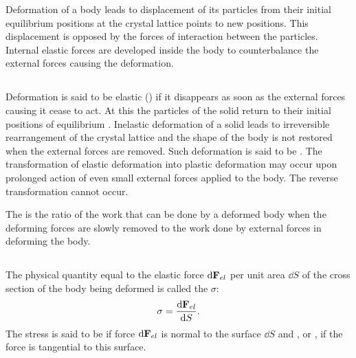 Deformation of a body leads to displacement of its particles from their initial equilibrium positions at the crystal lattice points  to new positions. This displacement is opposed by the forces of interaction between the particles. Internal elastic forces are developed inside the body to counterbalance the external forces causing the deformation.

\subsection{}\label{40.3.2} Deformation is said to be elastic () if it disappears as soon as the external forces causing it cease to act. At this the particles of the solid return to their initial positions of equilibrium . Inelastic deformation of a solid leads to irreversible rearrangement of the crystal lattice  and the shape of the body is not restored when the external forces are removed. Such deformation is said to be  . The transformation of elastic deformation into plastic deformation may occur upon prolonged action of even small external forces applied to the body. The reverse transformation cannot occur.

The  is the ratio of the work that can be done by a deformed body when the deforming forces are slowly removed to the work done by external forces in deforming the body.

\subsection{}\label{40.3.3} The physical quantity equal to the elastic force $\dd \vb{F}_{el}$ per unit area $\dd S$ of the cross section of the body being deformed is called the  $\sigma$:
\begin{equation*}%
\sigma = \dv{\vb{F}_{el}}{S}.
\end{equation*}
The stress is said to be  if force $\dd \vb{F}_{el}$ is normal to the surface $\dd S$ and , or , if the force is tangential to this surface. 

